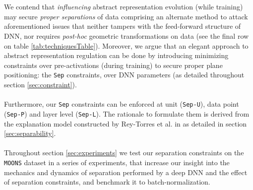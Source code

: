 \\\\
We contend that \emph{influencing} abstract representation evolution (while training) may secure \emph{proper separations} of data comprising an alternate method to attack aforementioned issues that neither tampers with the feed-forward structure of DNN, nor requires \emph{post-hoc} geometric transformations on data (see the final row on table \ref{tab:techniquesTable}). Moreover, we argue that an elegant approach to abstract representation regulation can be done by introducing minimizing constraints over pre-activations (during training) to secure proper plane positioning: the \texttt{Sep} constraints, over DNN parameters (as detailed throughout section \ref{sec:constraint}).
\\\\
Furthermore, our \texttt{Sep} constraints can be enforced at unit (\texttt{Sep-U}), data point (\texttt{Sep-P}) and layer level (\texttt{Sep-L}). The rationale to formulate them is derived from the explanation model constructed by Rey-Torres et al. in  \cite{reyRiera2019ModellingClassificationReLU} as detailed in section \ref{sec:separability}. 
\\\\
Throughout section \ref{sec:experiments} we test our separation constraints on the \texttt{MOONS} dataset in a series of experiments, that increase our insight into the mechanics and dynamics of separation performed by a deep DNN and the effect of  separation constraints, and benchmark it to batch-normalization.  

